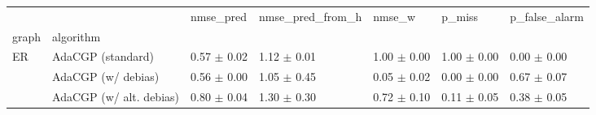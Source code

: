 \begin{tabular}{lllllll}
\toprule
   &                         &        nmse_pred & nmse_pred_from_h &           nmse_w &           p_miss &    p_false_alarm \\
graph & algorithm &                  &                  &                  &                  &                  \\
\midrule
ER & AdaCGP (standard) &  0.57 $\pm$ 0.02 &  1.12 $\pm$ 0.01 &  1.00 $\pm$ 0.00 &  1.00 $\pm$ 0.00 &  0.00 $\pm$ 0.00 \\
   & AdaCGP (w/ debias) &  0.56 $\pm$ 0.00 &  1.05 $\pm$ 0.45 &  0.05 $\pm$ 0.02 &  0.00 $\pm$ 0.00 &  0.67 $\pm$ 0.07 \\
   & AdaCGP (w/ alt. debias) &  0.80 $\pm$ 0.04 &  1.30 $\pm$ 0.30 &  0.72 $\pm$ 0.10 &  0.11 $\pm$ 0.05 &  0.38 $\pm$ 0.05 \\
\bottomrule
\end{tabular}
